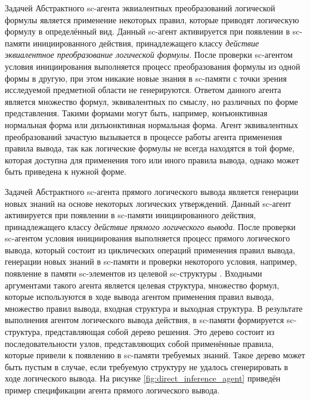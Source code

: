 Задачей Абстрактного sc-агента эквиалентных преобразований логической формулы является применение некоторых правил, которые приводят логическую формулу в определённый вид. Данный sc-агент активируется при появлении в sc-памяти инициированного действия, принадлежащего классу \textit{действие эквиалентное преобразование логической формулы}. После проверки sc-агентом условия инициирования выполняется процесс преобразования формулы из одной формы в другую, при этом никакие новые знания в sc-памяти с точки зрения исследуемой предметной области не генерируются. Ответом данного агента является множество формул, эквивалентных по смыслу, но различных по форме представления. Такими формами могут быть, например, конъюнктивная нормальная форма или дизъюнктивная нормальная форма. Агент эквивалентных преобразований зачастую вызывается в процессе работы агента применения правила вывода, так как логические формулы не всегда находятся в той форме, которая доступна для применения того или иного правила вывода, однако может быть приведена к нужной форме.

Задачей Абстрактного sc-агента прямого логического вывода является генерации новых знаний на основе некоторых логических утверждений. Данный sc-агент активируется при появлении в sc-памяти инициированного действия, принадлежащего классу \textit{действие прямого логического вывода}. После проверки sc-агентом условия инициирования выполняется процесс прямого логического вывода, который состоит из циклических операций применения правил вывода, генерации новых знаний в sc-памяти и проверки некоторого условия, например, появление в памяти sc-элементов из целевой sc-структуры \cite{gavrilova}. Входными аргументами такого агента является целевая структура, множество формул, которые используются в ходе вывода агентом применения правил вывода, множество правил вывода, входная структура и выходная структура. В результате выполнения агентом логического вывода действия, в sc-памяти формируется sc-структура, представляющая собой дерево решения. Это дерево состоит из последовательности узлов, представляющих собой применённые правила, которые привели к появлению в sc-памяти требуемых знаний. Такое дерево может быть пустым в случае, если требуемую структуру не удалось сгенерировать в ходе логического вывода. На рисунке \ref{fig:direct_inference_agent} приведён пример спецификации агента прямого логического вывода.

